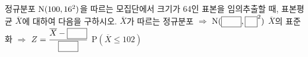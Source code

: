 정규분포 $\mathrm{N}(100{,}\mkern3mu\mathopen{}16^2)$을 따르는 모집단에서 크기가 64인 표본을 임의추출할 때, 표본평균 $\overline{X}$에 대하여 다음을 구하시오. 
 $\overline{X}$가 따르는 정규분포 $\Rightarrow$ $\mathrm{N}(\blank[2.4em]{,}\mkern3mu\mathopen{}\blank^{2})$
 $\overline{X}$의 표준화 $\Rightarrow$ $Z=\dfrac{\overline{X}-\blank[2.4em]}{\blank[2.4em]}$
 $\mathrm{P}(\overline{X}\le 102)$
